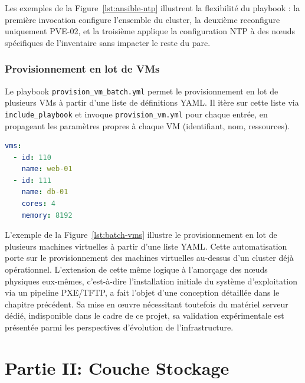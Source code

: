 \par Les exemples de la Figure~\ref{lst:ansible-ntp} illustrent la flexibilité du playbook : la première invocation configure l'ensemble du cluster, la deuxième reconfigure uniquement PVE-02, et la troisième applique la configuration NTP à des nœuds spécifiques de l'inventaire sans impacter le reste du parc.\\

\subsubsection{Provisionnement en lot de VMs}

\par Le playbook \texttt{provision\_vm\_batch.yml} permet le provisionnement en lot de plusieurs VMs à partir d'une liste de
définitions YAML. Il itère sur cette liste via \texttt{include\_playbook} et invoque \texttt{provision\_vm.yml} pour chaque entrée,
en propageant les paramètres propres à chaque VM (identifiant, nom, ressources).\\

\begin{lstlisting}[style=sonacode,language=yaml,caption={Exemple de liste de VMs pour
provision\_vm\_batch.yml},label={lst:batch-vms}]
vms:
  - id: 110
    name: web-01
  - id: 111
    name: db-01
    cores: 4
    memory: 8192
\end{lstlisting}

\par L'exemple de la Figure~\ref{lst:batch-vms} illustre le provisionnement en lot de plusieurs machines virtuelles à partir d'une liste YAML. Cette automatisation porte sur le provisionnement des machines virtuelles au-dessus d'un cluster déjà opérationnel.
L'extension de cette même logique à l'amorçage des nœuds physiques eux-mêmes, c'est-à-dire l'installation initiale du système
d'exploitation via un pipeline PXE/TFTP, a fait l'objet d'une conception détaillée dans le chapitre précédent. Sa mise en œuvre
nécessitant toutefois du matériel serveur dédié, indisponible dans le cadre de ce projet, sa validation expérimentale est présentée
parmi les perspectives d'évolution de l'infrastructure.\\


\section{Partie II: Couche Stockage}

